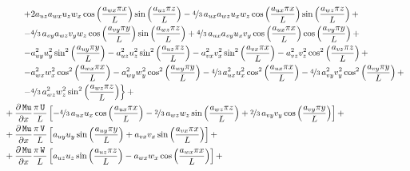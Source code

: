 \documentclass[10pt]{article}
\newcommand{\diff}[2] {\dfrac{\partial #1}{\partial #2}}
\newcommand{\U}{\,\mathtt{U}}
\newcommand{\V}{\,\mathtt{V}}
\newcommand{\W}{\,\mathtt{W}}
\newcommand{\Mu}{\,\mathtt{Mu}}
\newcommand{\DMuDx}{\diff{\Mu}{x}}
\begin{document}
\begin{equation*}
\begin{split}
 &\qquad\left.+ 2 a_{uz} a_{wx} u_{z} w_{x} \cos\left(\frac{a_{wx} \pi x}{L}\right) \sin\left(\frac{a_{uz} \pi z}{L}\right) - \nicefrac{4}{3} \, a_{ux} a_{wz} u_{x} w_{z} \cos\left(\frac{a_{ux} \pi x}{L}\right) \sin\left(\frac{a_{wz} \pi z}{L}\right) +\right.\\
 &\qquad\left.- \nicefrac{4}{3} \, a_{vy} a_{wz} v_{y} w_{z} \cos\left(\frac{a_{vy} \pi y}{L}\right) \sin\left(\frac{a_{wz} \pi z}{L}\right) + \nicefrac{4}{3} \, a_{ux} a_{vy} u_{x} v_{y} \cos\left(\frac{a_{ux} \pi x}{L}\right) \cos\left(\frac{a_{vy} \pi y}{L}\right) +\right.\\
 &\qquad\left.- a_{uy}^{2} u_{y}^{2} \sin^{2}\left(\frac{a_{uy} \pi y}{L}\right) - a_{uz}^{2} u_{z}^{2} \sin^{2}\left(\frac{a_{uz} \pi z}{L}\right) - a_{vx}^{2} v_{x}^{2} \sin^{2}\left(\frac{a_{vx} \pi x}{L}\right) - a_{vz}^{2} v_{z}^{2} \cos^{2}\left(\frac{a_{vz} \pi z}{L}\right) +\right.\\
 &\qquad\left.- a_{wx}^{2} w_{x}^{2} \cos^{2}\left(\frac{a_{wx} \pi x}{L}\right) - a_{wy}^{2} w_{y}^{2} \cos^{2}\left(\frac{a_{wy} \pi y}{L}\right) - \nicefrac{4}{3} \, a_{ux}^{2} u_{x}^{2} \cos^{2}\left(\frac{a_{ux} \pi x}{L}\right) - \nicefrac{4}{3} \, a_{vy}^{2} v_{y}^{2} \cos^{2}\left(\frac{a_{vy} \pi y}{L}\right) +\right.\\
 &\qquad\left.- \nicefrac{4}{3} \, a_{wz}^{2} w_{z}^{2} \sin^{2}\left(\frac{a_{wz} \pi z}{L}\right)\right\} +\\
%
&+ \DMuDx\frac{\pi \U \, }{L} \left[- \nicefrac{4}{3} \, a_{ux} u_{x} \cos\left(\frac{a_{ux} \pi x}{L}\right) - \nicefrac{2}{3} \, a_{wz} w_{z} \sin\left(\frac{a_{wz} \pi z}{L}\right) + \nicefrac{2}{3} \, a_{vy} v_{y} \cos\left(\frac{a_{vy} \pi y}{L}\right)\right]+ \\ 
&+ \DMuDx\frac{\pi \V \, }{L} \left[a_{uy} u_{y} \sin\left(\frac{a_{uy} \pi y}{L}\right) + a_{vx} v_{x} \sin\left(\frac{a_{vx} \pi x}{L}\right)\right] + \\ 
&+ \DMuDx\frac{\pi \W \, }{L} \left[a_{uz} u_{z} \sin\left(\frac{a_{uz} \pi z}{L}\right) - a_{wx} w_{x} \cos\left(\frac{a_{wx} \pi x}{L}\right)\right] + \\ 
 \end{split}
\end{equation*}
\end{document}
